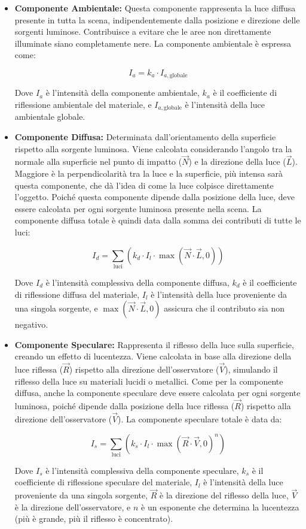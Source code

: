 \documentclass{article}
\begin{document}
\begin{itemize}
    \item \textbf{Componente Ambientale:} Questa componente rappresenta la luce diffusa presente in tutta la scena, indipendentemente dalla posizione e direzione delle sorgenti luminose. Contribuisce a evitare che le aree non direttamente illuminate siano completamente nere. La componente ambientale è espressa come:

    \[ I_a = k_a \cdot I_{a, \text{globale}} \]

    Dove \(I_a\) è l'intensità della componente ambientale, \(k_a\) è il coefficiente di riflessione ambientale del materiale, e \(I_{a, \text{globale}}\) è l'intensità della luce ambientale globale.
    
    \item \textbf{Componente Diffusa:} Determinata dall'orientamento della superficie rispetto alla sorgente luminosa. Viene calcolata considerando l'angolo tra la normale alla superficie nel punto di impatto (\(\vec{N}\)) e la direzione della luce (\(\vec{L}\)). Maggiore è la perpendicolarità tra la luce e la superficie, più intensa sarà questa componente, che dà l'idea di come la luce colpisce direttamente l'oggetto. Poiché questa componente dipende dalla posizione della luce, deve essere calcolata per ogni sorgente luminosa presente nella scena. La componente diffusa totale è quindi data dalla somma dei contributi di tutte le luci:

    \[ I_d = \sum_{\text{luci}} \left( k_d \cdot I_l \cdot \max(\vec{N} \cdot \vec{L}, 0) \right) \]

    Dove \(I_d\) è l'intensità complessiva della componente diffusa, \(k_d\) è il coefficiente di riflessione diffusa del materiale, \(I_l\) è l'intensità della luce proveniente da una singola sorgente, e \(\max(\vec{N} \cdot \vec{L}, 0)\) assicura che il contributo sia non negativo.

    \item \textbf{Componente Speculare:} Rappresenta il riflesso della luce sulla superficie, creando un effetto di lucentezza. Viene calcolata in base alla direzione della luce riflessa (\(\vec{R}\)) rispetto alla direzione dell'osservatore (\(\vec{V}\)), simulando il riflesso della luce su materiali lucidi o metallici. Come per la componente diffusa, anche la componente speculare deve essere calcolata per ogni sorgente luminosa, poiché dipende dalla posizione della luce riflessa (\(\vec{R}\)) rispetto alla direzione dell'osservatore (\(\vec{V}\)). La componente speculare totale è data da:

    \[ I_s = \sum_{\text{luci}} \left( k_s \cdot I_l \cdot \max(\vec{R} \cdot \vec{V}, 0)^n \right) \]

    Dove \(I_s\) è l'intensità complessiva della componente speculare, \(k_s\) è il coefficiente di riflessione speculare del materiale, \(I_l\) è l'intensità della luce proveniente da una singola sorgente, \(\vec{R}\) è la direzione del riflesso della luce, \(\vec{V}\) è la direzione dell'osservatore, e \(n\) è un esponente che determina la lucentezza (più è grande, più il riflesso è concentrato).
\end{itemize}
\end{document}
